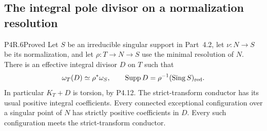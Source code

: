 \subsection{The integral pole divisor on a normalization resolution}

\begin{statement}{P4R.6}{Proved}
Let $S$ be an irreducible singular support in
Part~4.2, let $\nu:N\to S$ be its normalization,
and let $\rho:T\to N\to S$ use the minimal
resolution of $N$. There is an effective integral
divisor $D$ on $T$ such that
\[
 \omega_T(D)\simeq\rho^*\omega_S,
 \qquad \operatorname{Supp}D
       =\rho^{-1}(\operatorname{Sing}S)_{\rm red}.
\]
In particular $K_T+D$ is torsion, by P4.12.
The strict-transform conductor has its usual
positive integral coefficients. Every connected
exceptional configuration over a singular point
of $N$ has strictly positive coefficients in $D$.
Every such configuration meets the strict-transform
conductor.
\end{statement}
